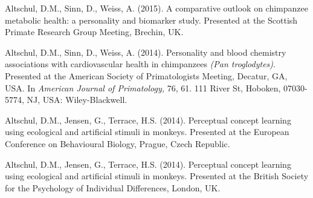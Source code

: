 \documentclass[margin,line]{res}
\begin{document}
\begin{resume}
Altschul, D.M., Sinn, D., Weiss, A. (2015). A comparative outlook on chimpanzee metabolic health: a personality and biomarker study. Presented at the Scottish Primate Research Group Meeting, Brechin, UK.

Altschul, D.M., Sinn, D., Weiss, A. (2014).  Personality and blood chemistry associations with cardiovascular health in chimpanzees {\it (Pan troglodytes)}. Presented at the American Society of Primatologists Meeting, Decatur, GA, USA. In {\it American Journal of Primatology,} 76, 61. 111 River St, Hoboken, 07030-5774, NJ, USA: Wiley-Blackwell.

Altschul, D.M., Jensen, G., Terrace, H.S. (2014). Perceptual concept learning using ecological and artificial stimuli in monkeys. Presented at the European Conference on Behavioural Biology, Prague, Czech Republic.

Altschul, D.M., Jensen, G., Terrace, H.S. (2014). Perceptual concept learning using ecological and artificial stimuli in monkeys. Presented at the British Society for the Psychology of Individual Differences, London, UK.


\end{resume}
\end{document}
